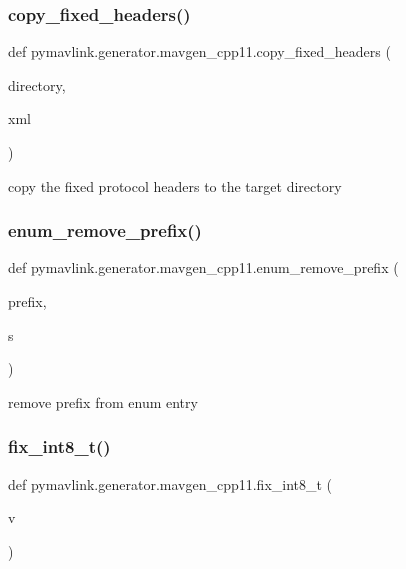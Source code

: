 \subsubsection{\texorpdfstring{copy\+\_\+fixed\+\_\+headers()}{copy\_fixed\_headers()}}
{\footnotesize\ttfamily def pymavlink.\+generator.\+mavgen\+\_\+cpp11.\+copy\+\_\+fixed\+\_\+headers (\begin{DoxyParamCaption}\item[{}]{directory,  }\item[{}]{xml }\end{DoxyParamCaption})}

\begin{DoxyVerb}copy the fixed protocol headers to the target directory\end{DoxyVerb}
 \mbox{\label{namespacepymavlink_1_1generator_1_1mavgen__cpp11_a62a78fb03297e16426b20e29b0f97332}} 
\subsubsection{\texorpdfstring{enum\+\_\+remove\+\_\+prefix()}{enum\_remove\_prefix()}}
{\footnotesize\ttfamily def pymavlink.\+generator.\+mavgen\+\_\+cpp11.\+enum\+\_\+remove\+\_\+prefix (\begin{DoxyParamCaption}\item[{}]{prefix,  }\item[{}]{s }\end{DoxyParamCaption})}

\begin{DoxyVerb}remove prefix from enum entry\end{DoxyVerb}
 \mbox{\label{namespacepymavlink_1_1generator_1_1mavgen__cpp11_a73fbdce6f04ff5bff120f5c0aca0effb}} 
\subsubsection{\texorpdfstring{fix\+\_\+int8\+\_\+t()}{fix\_int8\_t()}}
{\footnotesize\ttfamily def pymavlink.\+generator.\+mavgen\+\_\+cpp11.\+fix\+\_\+int8\+\_\+t (\begin{DoxyParamCaption}\item[{}]{v }\end{DoxyParamCaption})}

